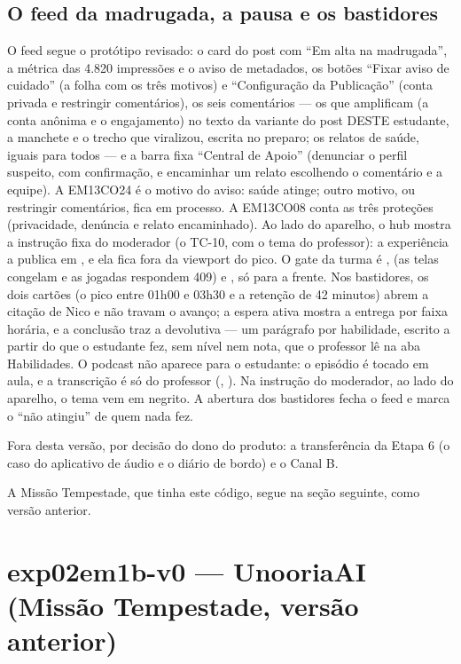 \subsection{O feed da madrugada, a pausa e os bastidores}

O feed segue o protótipo revisado: o card do post com \enquote{Em alta na
madrugada}, a métrica das 4.820 impressões e o aviso de metadados, os botões
\enquote{Fixar aviso de cuidado} (a folha com os três motivos) e
\enquote{Configuração da Publicação} (conta privada e restringir comentários),
os seis comentários --- os que amplificam (a conta anônima e o engajamento)
no texto da variante do post DESTE estudante, a manchete e o trecho que
viralizou, escrita no preparo; os relatos de saúde, iguais para todos --- e a
barra fixa \enquote{Central de Apoio} (denunciar o
perfil suspeito, com confirmação, e encaminhar um relato escolhendo o
comentário e a equipe). A EM13CO24 é o motivo do aviso: saúde atinge; outro
motivo, ou restringir comentários, fica em processo. A EM13CO08 conta as três
proteções (privacidade, denúncia e relato encaminhado). Ao lado do aparelho, o
hub mostra a instrução fixa do moderador (o TC-10, com o tema do professor):
a experiência a publica em , e ela fica fora da viewport do
pico. O gate da turma é ,  (as telas congelam e as
jogadas respondem 409) e , só para a frente. Nos bastidores, os
dois cartões (o pico entre 01h00 e 03h30 e a retenção de 42 minutos) abrem a
citação de Nico e não travam o avanço; a espera ativa mostra a entrega por
faixa horária, e a conclusão traz a devolutiva --- um parágrafo por
habilidade, escrito a partir do que o estudante fez, sem nível nem nota, que o
professor lê na aba Habilidades. O podcast não aparece para o estudante: o
episódio é tocado em aula, e a transcrição é só do professor (,
). Na instrução do moderador, ao lado do aparelho, o tema vem em
negrito. A abertura dos bastidores fecha o feed e marca o
\enquote{não atingiu} de quem nada fez.

Fora desta versão, por decisão do dono do produto: a transferência da Etapa 6
(o caso do aplicativo de áudio e o diário de bordo) e o Canal B.

A Missão Tempestade, que tinha este código, segue na seção seguinte, como
versão anterior.

\section{exp02em1b-v0 --- UnooriaAI (Missão Tempestade, versão anterior)}
\label{sec:exp02em1b}

